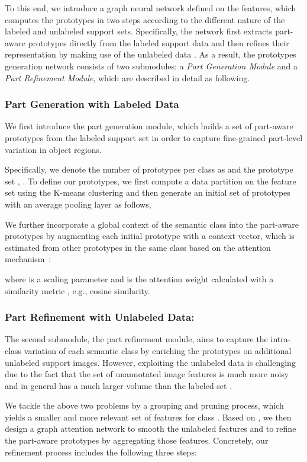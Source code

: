 \documentclass[runningheads]{llncs}
\begin{document}
To this end, we introduce a graph neural network defined on the features, which computes the prototypes in two steps according to the different nature of the labeled and unlabeled support sets. Specifically, the network first extracts part-aware prototypes directly from the labeled support data  and then refines their representation by making use of the unlabeled data . As a result, the prototypes generation network consists of two submodules: a \textit{Part Generation Module} and a \textit{Part Refinement Module}, which are described in detail as following.

\subsubsection{Part Generation with Labeled Data} \label{pap-gen}
We first introduce the part generation module, which builds a set of part-aware prototypes from the labeled support set in order to capture fine-grained part-level variation in object regions. 

Specifically, we denote the number of prototypes per class as  and the prototype set , . To define our prototypes, we first compute a data partition  on the feature set  using the K-means clustering and then generate an initial set of prototypes  with an average pooling layer as follows,   

We further incorporate a global context of the semantic class into the part-aware prototypes by augmenting each initial prototype with a context vector, which is estimated from other prototypes in the same class based on the attention mechanism~\cite{vaswani2017attention}:  

where  is a scaling parameter and  is the attention weight calculated with a similarity metric , e.g., cosine similarity. 

\subsubsection{Part Refinement with Unlabeled Data:}
The second submodule, the part refinement module, aims to capture the intra-class variation of each semantic class by enriching the prototypes on additional unlabeled support images. However, exploiting the unlabeled data is challenging due to the fact that the set of unannotated image features  is much more noisy and in general has a much larger volume than the labeled set .

We tackle the above two problems by a grouping and pruning process, which yields a smaller and more relevant set of features  for class . Based on , we then design a graph attention network to smooth the unlabeled features and to refine the part-aware prototypes by aggregating those features.   
Concretely, our refinement process includes the following three steps: 
\end{document}
